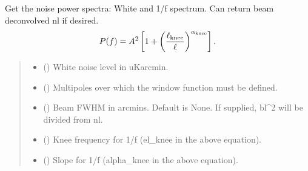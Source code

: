 \documentclass[letterpaper,10pt,english]{sphinxmanual}
\begin{document}

\begin{fulllineitems}
\label{\detokenize{tools:tools.get_nl}}
\pysigstartsignatures
{}
\pysigstopsignatures
\sphinxAtStartPar
Get the noise power spectra: White and 1/f spectrum.
Can return beam deconvolved nl if desired.
\begin{equation*}
\begin{split}P(f) = A^2 \left[ 1+ \left( \frac{\ell_{\rm knee}}{\ell}\right)^{\alpha_{\rm knee}} \right].\end{split}
\end{equation*}\begin{quote}\begin{description}
\begin{itemize}
\item {} 
\sphinxAtStartPar
{} () \textendash{} White noise level in uK\sphinxhyphen{}arcmin.

\item {} 
\sphinxAtStartPar
{} () \textendash{} Multipoles over which the window function must be defined.

\item {} 
\sphinxAtStartPar
{} () \textendash{} Beam FWHM in arcmins.
Default is None.
If supplied, bl\textasciicircum{}2 will be divided from nl.

\item {} 
\sphinxAtStartPar
{} () \textendash{} Knee frequency for 1/f  (el\_knee in the above equation).

\item {} 
\sphinxAtStartPar
{} () \textendash{} Slope for 1/f (alpha\_knee in the above equation).


\end{itemize}
\end{description}
\end{quote}
\end{fulllineitems}
\end{document}
